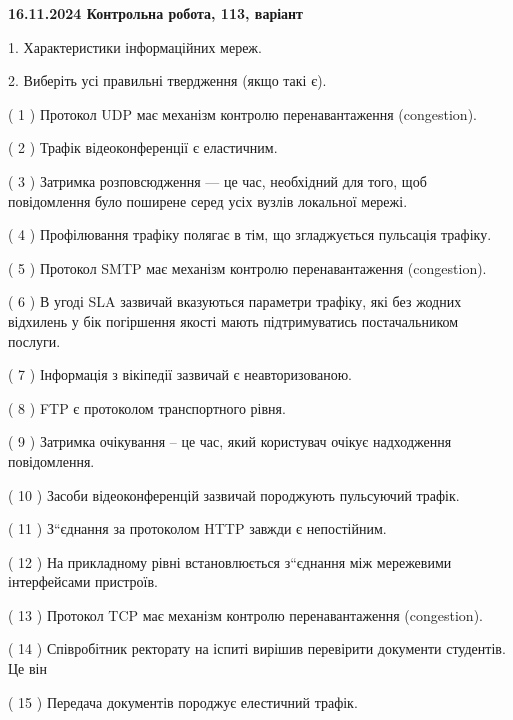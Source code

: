 \documentclass[12pt, ukrainian]{article}
\begin{document}
\vspace{4mm}
\newpage
\begin {large}

\textbf{16.11.2024 Контрольна робота, 113, варіант  }\par


{
1. Характеристики інформаційних мереж.



\vspace{5mm}
2. Виберіть усі правильні твердження (якщо такі є).\par
\vspace{2mm}

( 1 ) Протокол UDP має механізм контролю перенавантаження (congestion).

( 2 ) Трафік відеоконференції є еластичним.

( 3 ) Затримка розповсюдження — це час, необхідний для того, щоб повідомлення було поширене серед усіх вузлів локальної мережі.

( 4 ) Профілювання трафіку полягає в тім, що згладжується пульсація трафіку.

( 5 ) Протокол SMTP має механізм контролю перенавантаження (congestion).

( 6 ) В угоді SLA зазвичай вказуються параметри трафіку, які без жодних відхилень у бік погіршення якості мають підтримуватись постачальником послуги.

( 7 ) Інформація з вікіпедії зазвичай є неавторизованою.

( 8 ) FTP є протоколом транспортного рівня.

( 9 ) Затримка очікування – це час, який користувач очікує надходження повідомлення.

( 10 ) Засоби відеоконференцій зазвичай породжують пульсуючий трафік.

( 11 ) З“єднання за протоколом  HTTP завжди є непостійним.

( 12 ) На прикладному рівні встановлюється з“єднання між мережевими інтерфейсами пристроїв.

( 13 ) Протокол TCP має механізм контролю перенавантаження (congestion).

( 14 ) Співробітник ректорату на іспиті вирішив перевірити документи студентів. Це він

( 15 ) Передача документів породжує елестичний трафік.
}
\end {large}
\end{document}
